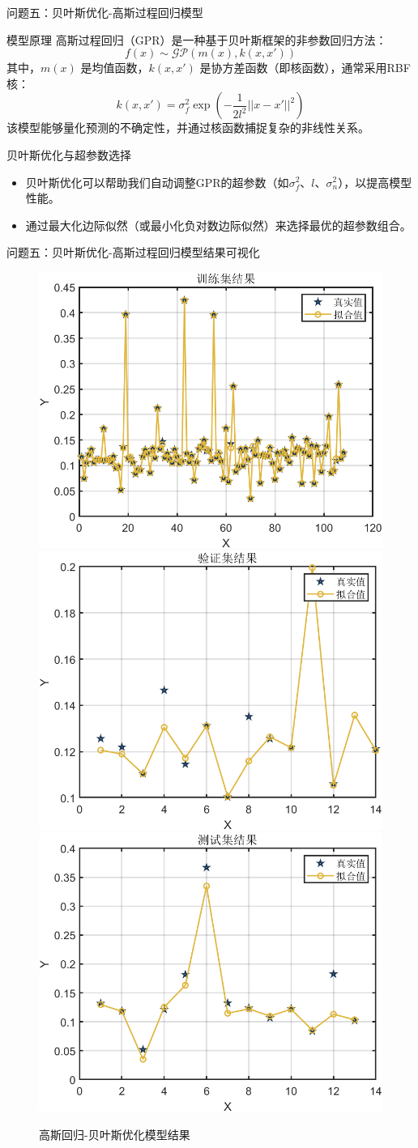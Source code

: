 \documentclass{beamer}
\begin{document}
\begin{frame}{问题五：贝叶斯优化-高斯过程回归模型}
    \scriptsize
    \begin{block}{模型原理}
        高斯过程回归（GPR）是一种基于贝叶斯框架的非参数回归方法：
        \[f(x) \sim \mathcal{GP}(m(x), k(x,x'))\]
        其中，$m(x)$ 是均值函数，$k(x,x')$ 是协方差函数（即核函数），通常采用RBF核：
        \[k(x,x') = \sigma_f^2 \exp(-\frac{1}{2l^2}||x-x'||^2)\]
        该模型能够量化预测的不确定性，并通过核函数捕捉复杂的非线性关系。
    \end{block}
    \begin{block}{贝叶斯优化与超参数选择}
        \begin{itemize}
            \item 贝叶斯优化可以帮助我们自动调整GPR的超参数（如$\sigma_f^2$、$l$、$\sigma_n^2$），以提高模型性能。
            \item 通过最大化边际似然（或最小化负对数边际似然）来选择最优的超参数组合。
        \end{itemize}
    \end{block}
\end{frame}

\begin{frame}{问题五：贝叶斯优化-高斯过程回归模型结果可视化}
    \scriptsize
    \begin{figure}
        \centering
        \includegraphics[width=0.32\linewidth]{pic/高斯回归+贝叶斯优化-训练集.png}
        \includegraphics[width=0.32\linewidth]{pic/高斯回归+贝叶斯优化-验证集.png}
        \includegraphics[width=0.32\linewidth]{pic/高斯回归+贝叶斯优化-测试集.png}
        \caption{高斯回归-贝叶斯优化模型结果}
        \label{fig:gaussian_bayesian_results}
    \end{figure}
\end{frame}
\end{document}
